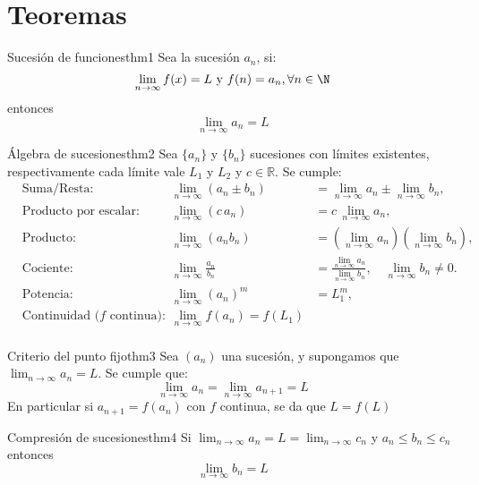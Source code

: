 \documentclass[12pt,a4paper]{article}
\begin{document}
\section{Teoremas}

\begin{teorema}{Sucesión de funciones}{thm1}
    Sea la sucesión $a_n$, si:
    \[ 
        \lim_{n \to \infty} f(x) = L \text{ y } f(n) = a_n, \forall n \in \N
    \]
    entonces
    \[ 
        \lim_{n \to \infty} a_n = L
    \]
\end{teorema}

\begin{teorema}{Álgebra de sucesiones}{thm2}
    Sea $\{a_n\}$ y $\{b_n\}$ sucesiones con límites existentes, respectivamente cada límite vale $L_1$ y $L_2$ y $c\in\mathbb{R}$. Se cumple:
    \[
    \begin{aligned}
        &\text{Suma/Resta:} & \lim_{n \to \infty} (a_n \pm b_n) &= \lim_{n \to \infty} a_n \pm \lim_{n \to \infty} b_n,\\
        &\text{Producto por escalar:} & \lim_{n \to \infty} (c\,a_n) &= c\,\lim_{n \to \infty} a_n,\\
        &\text{Producto:} & \lim_{n \to \infty} (a_n b_n) &= (\lim_{n \to \infty} a_n)(\lim_{n \to \infty} b_n),\\
        &\text{Cociente:} & \lim_{n \to \infty} \frac{a_n}{b_n} &= \frac{\lim\limits_{n \to \infty} a_n}{\lim\limits_{n \to \infty} b_n}, \quad \lim_{n\to\infty} b_n \neq 0. \\
        &\text{Potencia:} & \lim_{n \to \infty} (a_n)^m &= L_1^m,\\
        &\text{Continuidad ($f$ continua): } & \lim_{n \to \infty}f(a_n) = f(L_1) \\
    \end{aligned}
    \]
\end{teorema}

\begin{teorema}{Criterio del punto fijo}{thm3}
    Sea $(a_n)$ una sucesión, y supongamos que $\lim_{n \to \infty} a_n = L$. Se cumple que:
    \[ 
        \lim_{n \to \infty} a_n = \lim_{n \to \infty} a_{n + 1} = L
    \]
    En particular si $a_{n + 1} = f(a_n)$ con $f$ continua, se da que $L = f(L)$
\end{teorema}

\begin{teorema}{Compresión de sucesiones}{thm4}
    Si $\lim_{n \to \infty} a_n = L = \lim_{n \to \infty} c_n$ y $a_n \leq b_n \leq c_n$ entonces
    \[ 
        \lim_{n \to \infty} b_n = L
    \]
\end{teorema}

\end{document}
